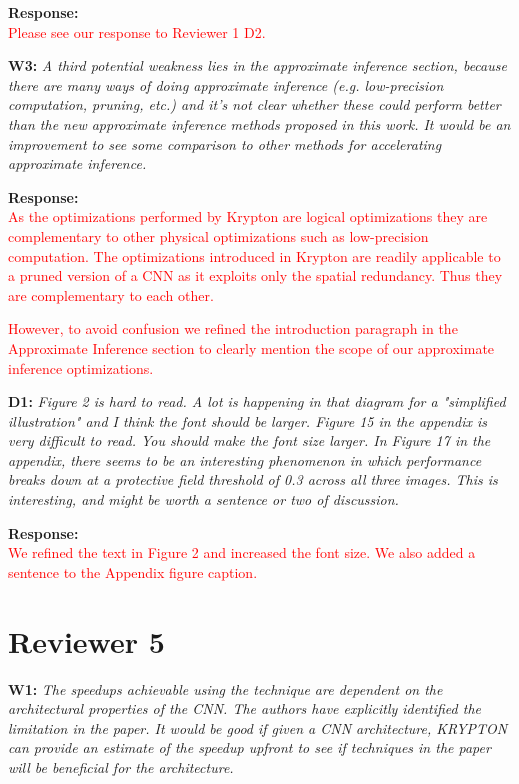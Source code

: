 \documentclass[preprint]{vldb}
\newcommand{\red}{\textcolor{red}}
\begin{document}
\vspace{2mm}
\noindent \textbf{Response:}\\
\red{Please see our response to Reviewer 1 D2.}

\vspace{2mm}
\noindent \textbf{W3:} \textit{A third potential weakness lies in the approximate inference section, because there are many ways of doing approximate inference (e.g. low-precision computation, pruning, etc.) and it's not clear whether these could perform better than the new approximate inference methods proposed in this work. It would be an improvement to see some comparison to other methods for accelerating approximate inference.}

\vspace{2mm}
\noindent \textbf{Response:}\\
\red{As the optimizations performed by Krypton are logical optimizations they are complementary to other physical optimizations such as low-precision computation. The optimizations introduced in Krypton are readily applicable to a pruned version of a CNN as it exploits only the spatial redundancy. Thus they are complementary to each other.
}

\red{However, to avoid confusion we refined the introduction paragraph in the Approximate Inference section to clearly mention the scope of our approximate inference optimizations.
}

\vspace{2mm}
\noindent \textbf{D1:} \textit{Figure 2 is hard to read. A lot is happening in that diagram for a "simplified illustration" and I think the font should be larger. Figure 15 in the appendix is very difficult to read. You should make the font size larger. In Figure 17 in the appendix, there seems to be an interesting phenomenon in which performance breaks down at a protective field threshold of 0.3 across all three images. This is interesting, and might be worth a sentence or two of discussion.}


\vspace{2mm}
\noindent \textbf{Response:}\\
\red{We refined the text in Figure 2 and increased the font size. We also added a sentence to the Appendix figure caption.}


\section{Reviewer 5}

\vspace{2mm}
\noindent \textbf{W1:} \textit{ The speedups achievable using the technique are dependent on the architectural properties of the CNN. The authors have explicitly identified the limitation in the paper. It would be good if given a CNN architecture, KRYPTON can provide an estimate of the speedup upfront to see if techniques in the paper will be beneficial for the architecture.}
\end{document}
